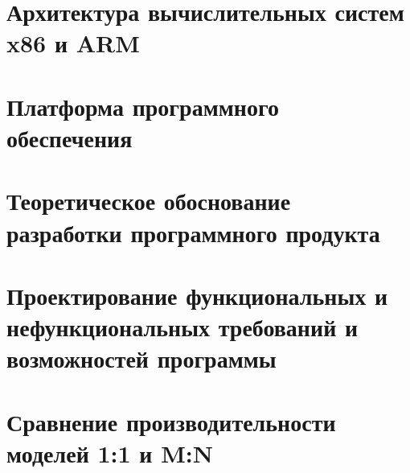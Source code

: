 \label{sec:introduction}


\section{Архитектура вычислительных систем x86 и ARM}
\label{sec:architecture}


\section{Платформа программного обеспечения}
\label{sec:software-platform}


\section{Теоретическое обоснование разработки программного продукта}
\label{sec:threading-models}


\section{Проектирование функциональных и нефункциональных требований и возможностей программы}
\label{sec:experiment-design}


\section{Сравнение производительности моделей 1:1 и M:N}
\label{sec:results}


\label{sec:conclusion}

